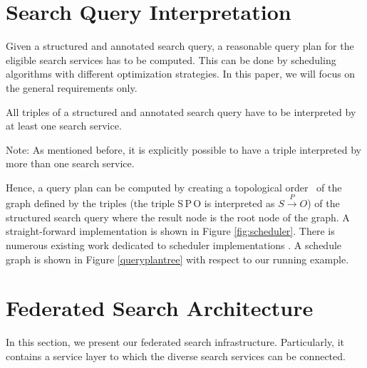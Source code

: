 \section{Search Query Interpretation}\label{chafedsearch:sec:queryinterpretation}


Given a structured and annotated search query, a rea\-so\-nable query plan for the eligible search services has to be computed.
This can be done by scheduling algorithms with different optimization strategies. 
In this paper, we will focus on the general requirements only.


\begin{req}
All triples of a structured and annotated search query have to be interpreted by at least one search service.
\end{req}
Note: As mentioned before, it is explicitly possible to have a triple interpreted by more than one search service.

Hence, a query plan can be computed by creating a to\-po\-lo\-gi\-cal order \cite{DBLP:books/aw/Knuth81}\ of the graph defined by the triples (\ie the triple S\,P\,O is interpreted as $S \xrightarrow{P} O$) of the structured search query where the result node is the root node of the graph.
A straight-forward implementation is shown in Fi\-gure \ref{fig:scheduler}.
There is numerous existing work dedicated to scheduler implementations \cite{XXX,YYY,ZZZ}.
A schedule graph is shown in Figure \ref{queryplantree} with respect to our running example.


\section{Federated Search Architecture}\label{chafedsearch:sec:federated}

In this section, we present our federated search in\-fra\-struc\-ture. 
Particularly, it contains a service layer to which the diverse search services can be connected. 

